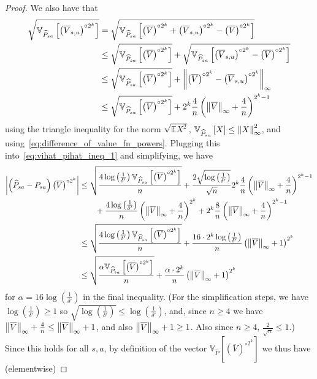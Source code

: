 \documentclass{article}
\theoremstyle{plain}
\theoremstyle{plain}
\theoremstyle{remark}
\theoremstyle{plain}
\theoremstyle{plain}
\newcommand{\E}{\mathbb{E}}
\newcommand{\Var}{\mathbb{V}}
\newcommand{\Phat}{\widehat{P}}
\newcommand{\Vc}{\overline{V}}
\begin{document}
\begin{proof}
We also have that
\begin{align*}
    \sqrt{\Var_{\Phat_{sa}} \left[ \left(\Vc_{s,u} \right)^{\circ 2^k} \right] }
    &= \sqrt{\Var_{\Phat_{sa}} \left[ \left(\Vc \right)^{\circ 2^k} + \left(\Vc_{s,u} \right)^{\circ 2^k} - \left(\Vc \right)^{\circ 2^k} \right] } \\
    & \leq \sqrt{\Var_{\Phat_{sa}} \left[ \left(\Vc \right)^{\circ 2^k}  \right] } + \sqrt{\Var_{\Phat_{sa}} \left[  \left(\Vc_{s,u} \right)^{\circ 2^k} - \left(\Vc \right)^{\circ 2^k} \right] } \\
    & \leq \sqrt{\Var_{\Phat_{sa}} \left[ \left(\Vc \right)^{\circ 2^k}  \right] } + \infnorm{\left( \Vc \right)^{\circ 2^k} - \left( \Vc_{s,u} \right)^{\circ 2^k}} \\
    & \leq \sqrt{\Var_{\Phat_{sa}} \left[ \left(\Vc \right)^{\circ 2^k}  \right] } + 2^{k} \frac{4}{n} \left( \infnorm{\Vc} + \frac{4}{n}\right)^{2^k - 1}
\end{align*}
using the triangle inequality for the norm $\sqrt{\E X^2}$, $\Var_{\Phat_{sa}} \left[ X\right] \leq \infnorm{X}^2$, and using~\eqref{eq:difference_of_value_fn_powers}. Plugging this into~\eqref{eq:vihat_pihat_ineq_1} and simplifying, we have
\begin{align*}
    \left| \left(\Phat_{sa} - P_{sa}\right) \left(\Vc \right)^{\circ 2^k} \right| 
    &\leq \sqrt{\frac{4\log\left( \frac{1}{\delta'}\right) \Var_{\Phat_{sa}} \left[ \left(\Vc \right)^{\circ 2^k}  \right]    }{n }} +   \frac{2 \sqrt{\log \left(\frac{1}{\delta'} \right)}}{\sqrt{n}} 2^{k} \frac{4}{n} \left( \infnorm{\Vc} + \frac{4}{n}\right)^{2^k - 1} \\
    & \quad \quad + \frac{4 \log \left( \frac{1}{\delta'} \right)}{n} \left( \infnorm{\Vc} + \frac{4}{n}\right)^{2^k } + 2^{k}\frac{8}{n} \left( \infnorm{\Vc} + \frac{4}{n}\right)^{2^k - 1} \\
    & \leq \sqrt{\frac{4\log\left( \frac{1}{\delta'}\right) \Var_{\Phat_{sa}} \left[ \left(\Vc \right)^{\circ 2^k}  \right]    }{n }} +   \frac{16 \cdot 2^k \log \left(\frac{1}{\delta'} \right)}{n}  \left( \infnorm{\Vc} + 1\right)^{2^k} \\
    & \leq \sqrt{\frac{\alpha \Var_{\Phat_{sa}} \left[ \left(\Vc \right)^{\circ 2^k}  \right]    }{n }} +   \frac{ \alpha \cdot 2^k }{n}  \left( \infnorm{\Vc} + 1\right)^{2^k}
\end{align*}
for $\alpha = 16 \log\left( \frac{1}{\delta'}\right)  $ in the final inequality. (For the simplification steps, we have $\log \left( \frac{1}{\delta'}\right) \geq 1$ so $\sqrt{\log \left( \frac{1}{\delta'}\right)} \leq \log \left( \frac{1}{\delta'}\right)$, and, since $n \geq 4$ we have $ \infnorm{\Vc} + \frac{4}{n} \leq \infnorm{\Vc} + 1$, and also $\infnorm{\Vc} + 1 \geq 1$. Also since $n \geq 4$, $\frac{2}{\sqrt{n}} \leq 1$.) Since this holds for all $s,a$, by definition of the vector $ \Var_{\Phat} \left[ \left(\Vc \right)^{\circ 2^k}  \right]$ we thus have (elementwise)

\end{proof}
\end{document}

